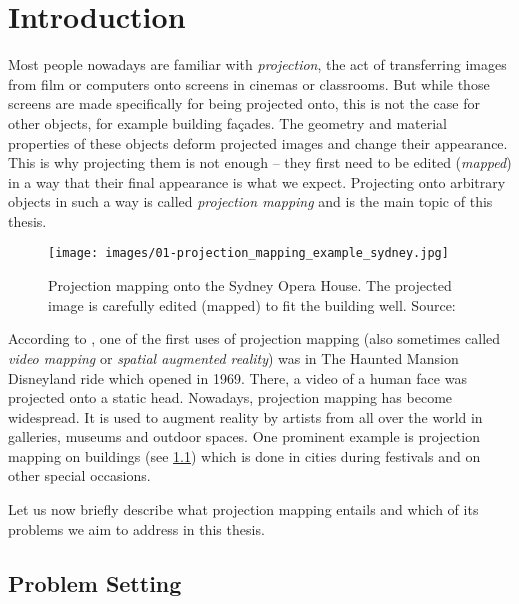 \chapter{Introduction}
\label{chapter:intro}


Most people nowadays are familiar with \textit{projection}, the act of transferring images from film or computers onto screens in cinemas or classrooms. But while those screens are made specifically for being projected onto, this is not the case for other objects, for example building façades. The geometry and material properties of these objects deform projected images and change their appearance. This is why projecting them is not enough -- they first need to be edited (\textit{mapped}) in a way that their final appearance is what we expect. Projecting onto arbitrary objects in such a way is called \textit{projection mapping} and is the main topic of this thesis.

\begin{figure}[ht]
    \begin{center}
        \texttt{[image: images/01-projection\_mapping\_example\_sydney.jpg]}
        \caption{Projection mapping onto the Sydney Opera House. The projected image is carefully edited (mapped) to fit the building well. Source: \citet{ImageProjectionMappingExampleSydney}}
        \label{fig:intro_example_sydney}
    \end{center}
\end{figure}

According to \citet*{WikiHauntedMansion}, one of the first uses of projection mapping (also sometimes called \textit{video mapping} or \textit{spatial augmented reality}) was in The Haunted Mansion Disneyland ride which opened in 1969. There, a video of a human face was projected onto a static head. Nowadays, projection mapping has become widespread. It is used to augment reality by artists from all over the world in galleries, museums and outdoor spaces. One prominent example is projection mapping on buildings (see \ref{fig:intro_example_sydney}) which is done in cities during festivals and on other special occasions.

Let us now briefly describe what projection mapping entails and which of its problems we aim to address in this thesis.

\section{Problem Setting}
\label{section:intro-problem_setting}

